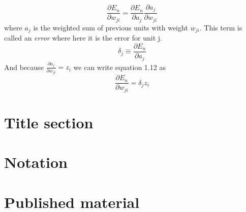 \begin{equation}
        \frac{\partial E_n}{\partial w_{ji}} =  \frac{\partial E_n}{\partial a_j} \frac{\partial a_j}{\partial w_{ji}}
\end{equation} where $a_j$ is the weighted sum of previous units with weight $w_{ji}$. This term is called an \textit{error} where here it is the error for unit j.
\begin{equation}
    \delta_{j} \equiv \frac{\partial E_n}{\partial a_j} 
\end{equation}
And because $\frac{\partial a_j}{\partial w_{ji}} = z_{i}$ we can write equation 1.12 as
\begin{equation}
    \frac{\partial E_n}{\partial w_{ji}} =  \delta_{j} z_{i}
\end{equation}













\section{Title section}
\section{Notation}
\section{Published material}



